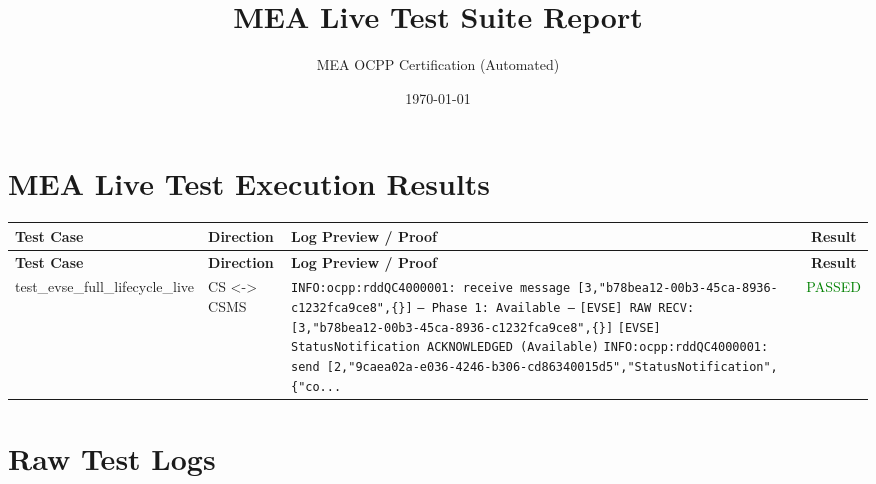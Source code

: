\documentclass[10pt, a4paper, landscape]{article}
\title{\textbf{MEA Live Test Suite Report}}
\author{MEA OCPP Certification (Automated)}
\date{\today}
\begin{document}
\maketitle

\section*{MEA Live Test Execution Results}

\renewcommand{\arraystretch}{1.3}
\begin{longtable}{|p{6cm}|p{2.5cm}|p{10cm}|c|}
\hline
\rowcolor{gray!30}
\textbf{Test Case} & \textbf{Direction} & \textbf{Log Preview / Proof} & \textbf{Result} \\
\hline
\endfirsthead

\hline
\hline
\rowcolor{gray!30}
\textbf{Test Case} & \textbf{Direction} & \textbf{Log Preview / Proof} & \textbf{Result} \\
\hline
\endhead

\hline
\endfoot
test\_evse\_full\_lifecycle\_live & CS <-> CSMS & \texttt{\scriptsize INFO:ocpp:rddQC4000001: receive message [3,"b78bea12-00b3-45ca-8936-c1232fca9ce8",\{\}]} \newline \texttt{\scriptsize } \newline \texttt{\scriptsize --- Phase 1: Available ---} \newline \texttt{\scriptsize } \newline \texttt{\scriptsize [EVSE] RAW RECV: [3,"b78bea12-00b3-45ca-8936-c1232fca9ce8",\{\}]} \newline \texttt{\scriptsize } \newline \texttt{\scriptsize [EVSE] StatusNotification ACKNOWLEDGED (Available)} \newline \texttt{\scriptsize INFO:ocpp:rddQC4000001: send [2,"9caea02a-e036-4246-b306-cd86340015d5","StatusNotification",\{"co...} & \textcolor{green}{PASSED} \\
\hline

\end{longtable}
\newpage
\appendix
\section{Raw Test Logs}
\label{sec:raw_logs}
\normalsize

\end{document}
